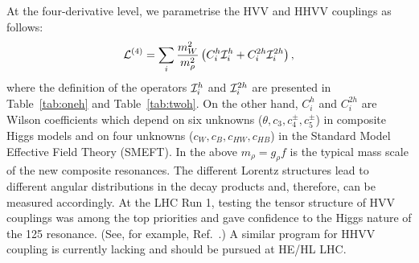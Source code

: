 At the four-derivative level, we parametrise the HVV and HHVV couplings  as follows:
\begin{equation}
\label{eq:Cis}
{\cal L}^{(4)} =  \sum_i\frac{m_W^2}{m_\rho^2} \left(C^h_i {\cal I}^h_i  +C^{2h}_i {\cal I}^{2h}_i\right) ,
\end{equation}
where the definition of the  operators ${\cal I}^h_i$ and ${\cal I}^{2h}_i$ are presented in Table~\ref{tab:oneh} and Table~\ref{tab:twoh}. On the other hand, $C^h_i$ and $C^{2h}_i$ are Wilson coefficients which depend on six unknowns ($\theta, c_3, c_4^\pm, c_5^\pm$) in composite Higgs models and on four unknowns ($c_W, c_B, c_{HW}, c_{HB}$)  in the Standard Model Effective Field Theory (SMEFT). In the above $m_\rho=g_\rho f$ is the typical mass scale of the new composite resonances. The different Lorentz structures lead to different angular distributions in the decay products and, therefore, can be measured accordingly. At the LHC Run 1,  testing the tensor structure of HVV couplings was among the top priorities and gave confidence to the Higgs nature of the 125 \UGeV resonance. (See, for example, Ref.~\cite{Sirunyan:2017tqd}.) A similar program for HHVV coupling is currently lacking and should be pursued at HE/HL LHC.

